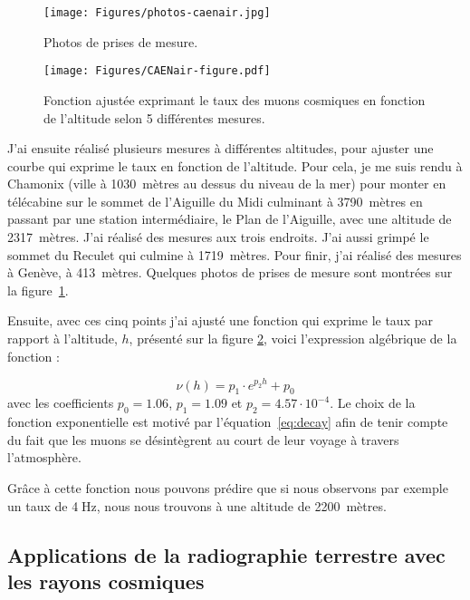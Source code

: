 \documentclass[a4paper, 12pt]{article}
\begin{document}
\begin{spacing}{1.5}
\begin{figure}[t]
\begin{center}
\texttt{[image: Figures/photos-caenair.jpg]}
\caption{\label{fig:photos-caenair} Photos de prises de mesure.}
\end{center}
\end{figure}
\begin{figure}[t]
\begin{center}
\texttt{[image: Figures/CAENair-figure.pdf]}
\caption{\label{fig:CAENair-figure} Fonction ajustée exprimant le taux des muons cosmiques en fonction de l'altitude selon 5 différentes mesures.}
\end{center}
\end{figure}

J'ai ensuite réalisé plusieurs mesures à différentes altitudes, pour ajuster une courbe qui exprime le taux en fonction de l'altitude. Pour cela, je me suis rendu à Chamonix (ville à 1030~mètres au dessus du niveau de la mer) pour monter en télécabine sur le sommet de l'Aiguille du Midi culminant à 3790~mètres en passant par une station intermédiaire, le Plan de l'Aiguille, avec une altitude de 2317~mètres. J'ai réalisé des mesures aux trois endroits. J'ai aussi grimpé le sommet du Reculet qui culmine à 1719~mètres. Pour finir, j'ai réalisé des mesures à Genève, à 413~mètres. Quelques photos de prises de mesure sont montrées sur la figure~\ref{fig:photos-caenair}.

Ensuite, avec ces cinq points j'ai ajusté une fonction qui exprime le taux par rapport à l'altitude, $h$, présenté sur la figure \ref{fig:CAENair-figure}, voici l'expression algébrique de la fonction :

\begin{equation}
\nu(h) = p_1\cdot e^{p_2  h} +  p_0
\end{equation}
avec les coefficients $p_0=1.06$, $p_1=1.09$ et $p_2=4.57\cdot 10^{-4}$. Le choix de la fonction exponentielle est motivé par l'équation~\ref{eq:decay} afin de tenir compte du fait que les muons se désintègrent au court de leur voyage à travers l'atmosphère.

Grâce à cette fonction nous pouvons prédire que si nous observons par exemple un taux de 4$\;$Hz, nous nous trouvons à une altitude de 2200~mètres.

\subsection{Applications de la radiographie terrestre avec les rayons cosmiques}


\end{spacing}
\end{document}

